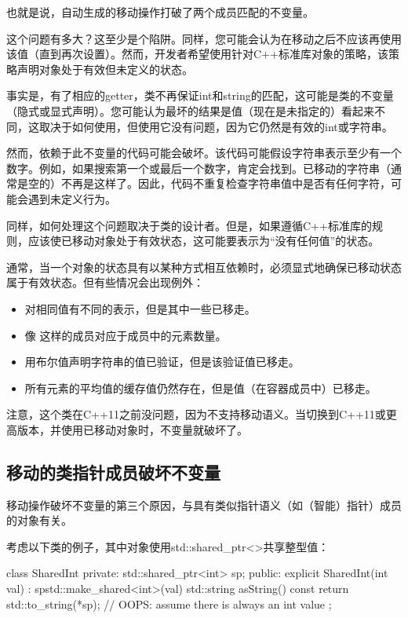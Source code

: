 也就是说，自动生成的移动操作打破了两个成员匹配的不变量。

这个问题有多大？这至少是个陷阱。同样，您可能会认为在移动之后不应该再使用该值（直到再次设置）。然而，开发者希望使用针对C++标准库对象的策略，该策略声明对象处于有效但未定义的状态。

事实是，有了相应的getter，类不再保证int和string的匹配，这可能是类的不变量（隐式或显式声明）。您可能认为最坏的结果是值（现在是未指定的）看起来不同，这取决于如何使用，但使用它没有问题，因为它仍然是有效的int或字符串。

然而，依赖于此不变量的代码可能会破坏。该代码可能假设字符串表示至少有一个数字。例如，如果搜索第一个或最后一个数字，肯定会找到。已移动的字符串（通常是空的）不再是这样了。因此，代码不重复检查字符串值中是否有任何字符，可能会遇到未定义行为。

同样，如何处理这个问题取决于类的设计者。但是，如果遵循C++标准库的规则，应该使已移动对象处于有效状态，这可能要表示为“没有任何值”的状态。

通常，当一个对象的状态具有以某种方式相互依赖时，必须显式地确保已移动状态属于有效状态。但有些情况会出现例外：

\begin{itemize}
	\item 对相同值有不同的表示，但是其中一些已移走。
	\item 像  这样的成员对应于成员中的元素数量。
	\item 用布尔值声明字符串的值已验证，但是该验证值已移走。
	\item 所有元素的平均值的缓存值仍然存在，但是值（在容器成员中）已移走。
\end{itemize}

注意，这个类在C++11之前没问题，因为不支持移动语义。当切换到C++11或更高版本，并使用已移动对象时，不变量就破坏了。

\subsection{移动的类指针成员破坏不变量}

移动操作破坏不变量的第三个原因，与具有类似指针语义（如（智能）指针）成员的对象有关。

考虑以下类的例子，其中对象使用std::shared_ptr<>共享整型值：

\begin{cppcode}
class SharedInt {
private:
	std::shared_ptr<int> sp;
public:
	explicit SharedInt(int val)
	: sp{std::make_shared<int>(val)} {
	}
	std::string asString() const {
		return std::to_string(*sp); // OOPS: assume there is always an int value
	}
};
\end{cppcode}

